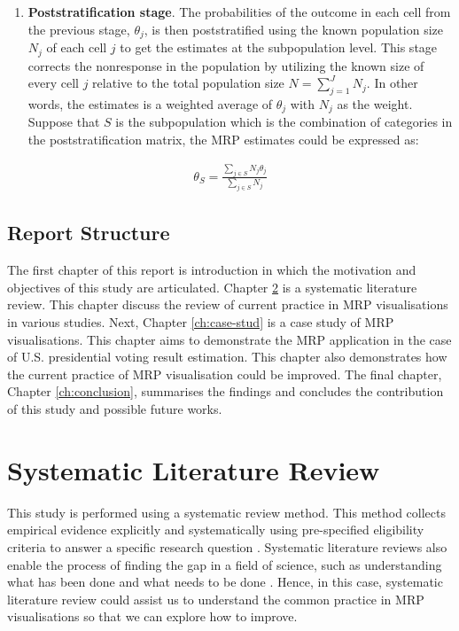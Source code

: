 \documentclass{monashthesis}
\begin{document}
\begin{enumerate}
\def\labelenumi{\arabic{enumi}.}
\setcounter{enumi}{1}
\tightlist
\item
  \textbf{Poststratification stage}. The probabilities of the outcome in each cell from the previous stage, \(\theta_j\), is then poststratified using the known population size \(N_j\) of each cell \(j\) to get the estimates at the subpopulation level. This stage corrects the nonresponse in the population by utilizing the known size of every cell \(j\) relative to the total population size \(N = \sum_{j=1}^J N_j\). In other words, the estimates is a weighted average of \(\theta_j\) with \(N_j\) as the weight. Suppose that \(S\) is the subpopulation which is the combination of categories in the poststratification matrix, the MRP estimates could be expressed as:
\end{enumerate}

\begin{equation} 
\begin{split}
\theta_S = \frac{\sum_{j \in S}N_j\theta_j}{\sum_{j\in S}N_j}
\end{split}
\label{eq:mrp-stage2}
\end{equation}

\hypertarget{report-structure}{%
\section{Report Structure}\label{report-structure}}

The first chapter of this report is introduction in which the motivation and objectives of this study are articulated. Chapter \ref{ch:syslitrev} is a systematic literature review. This chapter discuss the review of current practice in MRP visualisations in various studies. Next, Chapter \ref{ch:case-stud} is a case study of MRP visualisations. This chapter aims to demonstrate the MRP application in the case of U.S. presidential voting result estimation. This chapter also demonstrates how the current practice of MRP visualisation could be improved. The final chapter, Chapter \ref{ch:conclusion}, summarises the findings and concludes the contribution of this study and possible future works.

\hypertarget{ch:syslitrev}{%
\chapter{Systematic Literature Review}\label{ch:syslitrev}}

This study is performed using a systematic review method. This method collects empirical evidence explicitly and systematically using pre-specified eligibility criteria to answer a specific research question \autocite{cochrane}. Systematic literature reviews also enable the process of finding the gap in a field of science, such as understanding what has been done and what needs to be done \autocite{LinnenlueckeMartinaK2020Cslr}. Hence, in this case, systematic literature review could assist us to understand the common practice in MRP visualisations so that we can explore how to improve.
\end{document}
